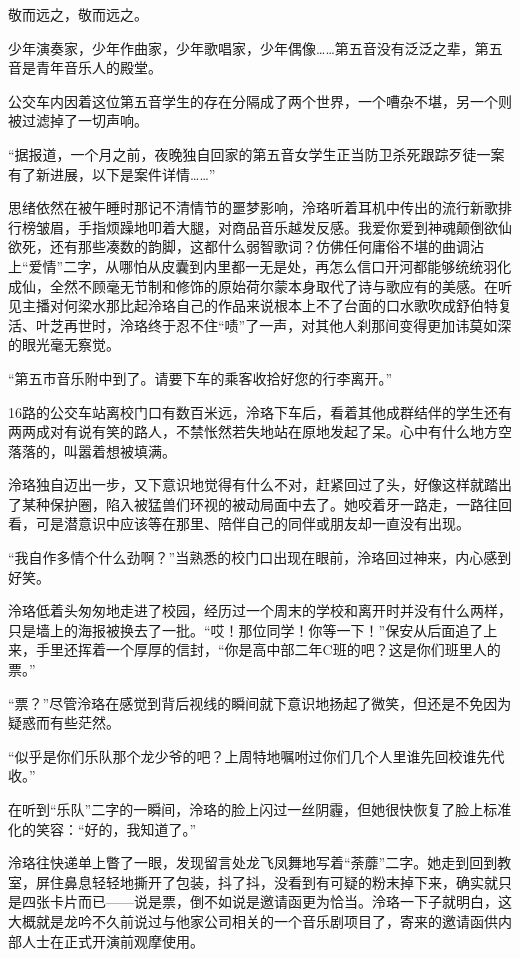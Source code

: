 \documentclass[UTF8, scheme = chinese, openany]{ctexbook}
\begin{document}
敬而远之，敬而远之。

少年演奏家，少年作曲家，少年歌唱家，少年偶像……第五音没有泛泛之辈，第五音是青年音乐人的殿堂。

公交车内因着这位第五音学生的存在分隔成了两个世界，一个嘈杂不堪，另一个则被过滤掉了一切声响。

“据报道，一个月之前，夜晚独自回家的第五音女学生正当防卫杀死跟踪歹徒一案有了新进展，以下是案件详情……”

思绪依然在被午睡时那记不清情节的噩梦影响，泠珞听着耳机中传出的流行新歌排行榜皱眉，手指烦躁地叩着大腿，对商品音乐越发反感。我爱你爱到神魂颠倒欲仙欲死，还有那些凑数的韵脚，这都什么弱智歌词？仿佛任何庸俗不堪的曲调沾上“爱情”二字，从哪怕从皮囊到内里都一无是处，再怎么信口开河都能够统统羽化成仙，全然不顾毫无节制和修饰的原始荷尔蒙本身取代了诗与歌应有的美感。在听见主播对何梁水那比起泠珞自己的作品来说根本上不了台面的口水歌吹成舒伯特复活、叶芝再世时，泠珞终于忍不住“啧”了一声，对其他人刹那间变得更加讳莫如深的眼光毫无察觉。

“第五市音乐附中到了。请要下车的乘客收拾好您的行李离开。”

16路的公交车站离校门口有数百米远，泠珞下车后，看着其他成群结伴的学生还有两两成对有说有笑的路人，不禁怅然若失地站在原地发起了呆。心中有什么地方空落落的，叫嚣着想被填满。

泠珞独自迈出一步，又下意识地觉得有什么不对，赶紧回过了头，好像这样就踏出了某种保护圈，陷入被猛兽们环视的被动局面中去了。她咬着牙一路走，一路往回看，可是潜意识中应该等在那里、陪伴自己的同伴或朋友却一直没有出现。

“我自作多情个什么劲啊？”当熟悉的校门口出现在眼前，泠珞回过神来，内心感到好笑。

泠珞低着头匆匆地走进了校园，经历过一个周末的学校和离开时并没有什么两样，只是墙上的海报被换去了一批。“哎！那位同学！你等一下！”保安从后面追了上来，手里还挥着一个厚厚的信封，“你是高中部二年C班的吧？这是你们班里人的票。”

“票？”尽管泠珞在感觉到背后视线的瞬间就下意识地扬起了微笑，但还是不免因为疑惑而有些茫然。

“似乎是你们乐队那个龙少爷的吧？上周特地嘱咐过你们几个人里谁先回校谁先代收。”

在听到“乐队”二字的一瞬间，泠珞的脸上闪过一丝阴霾，但她很快恢复了脸上标准化的笑容：“好的，我知道了。”

泠珞往快递单上瞥了一眼，发现留言处龙飞凤舞地写着“荼蘼”二字。她走到回到教室，屏住鼻息轻轻地撕开了包装，抖了抖，没看到有可疑的粉末掉下来，确实就只是四张卡片而已——说是票，倒不如说是邀请函更为恰当。泠珞一下子就明白，这大概就是龙吟不久前说过与他家公司相关的一个音乐剧项目了，寄来的邀请函供内部人士在正式开演前观摩使用。
\end{document}
